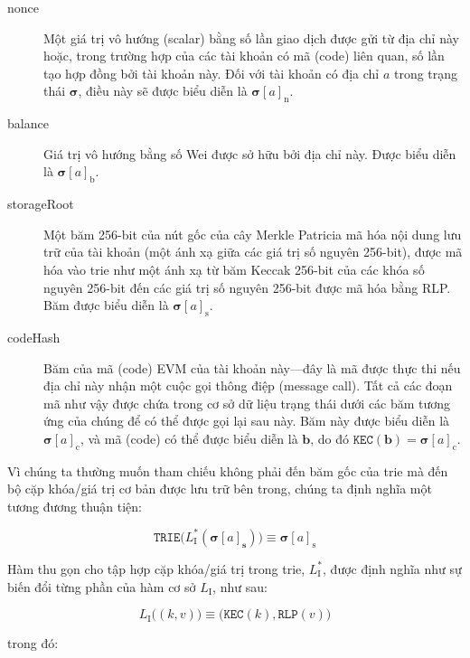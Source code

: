 \documentclass[9pt,oneside]{amsart}
\makeatletter
\newcommand{\linkdest}[1]{\Hy@raisedlink{\hypertarget{#1}{}}}
\makeatother
\begin{document}
\begin{multicols}{2}
\begin{description}
\item[nonce] \linkdest{account_nonce}Một giá trị vô hướng (scalar) bằng số lần giao dịch được gửi từ địa chỉ này hoặc, trong trường hợp của các tài khoản có mã (code) liên quan, số lần tạo hợp đồng bởi tài khoản này. Đối với tài khoản có địa chỉ $a$ trong trạng thái $\boldsymbol{\sigma}$, điều này sẽ được biểu diễn là $\boldsymbol{\sigma}[a]_{\mathrm{n}}$.
\item[balance] Giá trị vô hướng bằng số Wei được sở hữu bởi địa chỉ này. Được biểu diễn là $\boldsymbol{\sigma}[a]_{\mathrm{b}}$.
\item[storageRoot] Một băm 256-bit của nút gốc của cây Merkle Patricia mã hóa nội dung lưu trữ của tài khoản (một ánh xạ giữa các giá trị số nguyên 256-bit), được mã hóa vào trie như một ánh xạ từ băm Keccak 256-bit của các khóa số nguyên 256-bit đến các giá trị số nguyên 256-bit được mã hóa bằng RLP. Băm được biểu diễn là $\boldsymbol{\sigma}[a]_{\mathrm{s}}$.
\item[codeHash] Băm của mã (code) EVM của tài khoản này—đây là mã được thực thi nếu địa chỉ này nhận một cuộc gọi thông điệp (message call). Tất cả các đoạn mã như vậy được chứa trong cơ sở dữ liệu trạng thái dưới các băm tương ứng của chúng để có thể được gọi lại sau này. Băm này được biểu diễn là $\boldsymbol{\sigma}[a]_{\mathrm{c}}$, và mã (code) có thể được biểu diễn là $\mathbf{b}$, do đó $\texttt{KEC}(\mathbf{b}) = \boldsymbol{\sigma}[a]_{\mathrm{c}}$.
\end{description}

Vì chúng ta thường muốn tham chiếu không phải đến băm gốc của trie mà đến bộ cặp khóa/giá trị cơ bản được lưu trữ bên trong, chúng ta định nghĩa một tương đương thuận tiện:

\begin{equation}
\texttt{TRIE}\big(L_{\mathrm{I}}^*(\boldsymbol{\sigma}[a]_{\mathbf{s}})\big) \equiv \boldsymbol{\sigma}[a]_{\mathrm{s}}
\end{equation}

Hàm thu gọn cho tập hợp cặp khóa/giá trị trong trie, $L_{\mathrm{I}}^*$, được định nghĩa như sự biến đổi từng phần của hàm cơ sở $L_{\mathrm{I}}$, như sau:

\begin{equation}
L_{\mathrm{I}}\big( (k, v) \big) \equiv \big(\texttt{KEC}(k), \texttt{RLP}(v)\big)
\end{equation}

trong đó:


\end{multicols}
\end{document}
